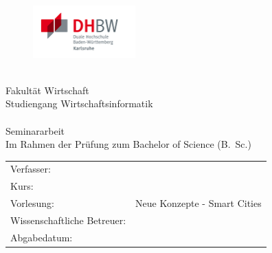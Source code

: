 

\begin{titlepage}
	\pagestyle{empty}
	\centering
	\begin{figure}
		\centering
		\includegraphics[height=2cm]{title_graphics/dhbw_karlsruhe}
	\end{figure}
	\mbox{}\vspace{1\baselineskip}\\
	\rmfamily\Large
	\centering
	Fakultät Wirtschaft\\
	Studiengang Wirtschaftsinformatik
	\vspace{1\baselineskip}\\
	\sffamily\huge
	\centering
	\mytitle
	\vspace{1\baselineskip}\\
	\rmfamily\Large
	Seminararbeit\\
	\normalsize
	Im Rahmen der Prüfung zum Bachelor of Science (B.~Sc.)
	\vspace{5\baselineskip}\\
	\rmfamily\normalsize
	\begin{tabular}{ll}
		Verfasser:						& \me\\
		Kurs: 							& \course\\
		Vorlesung:						& Neue Konzepte - Smart Cities \\
		Wissenschaftliche Betreuer: 	& \supervisor\\
		Abgabedatum: 					& \handoverdate\\
	\end{tabular}
	
\end{titlepage}